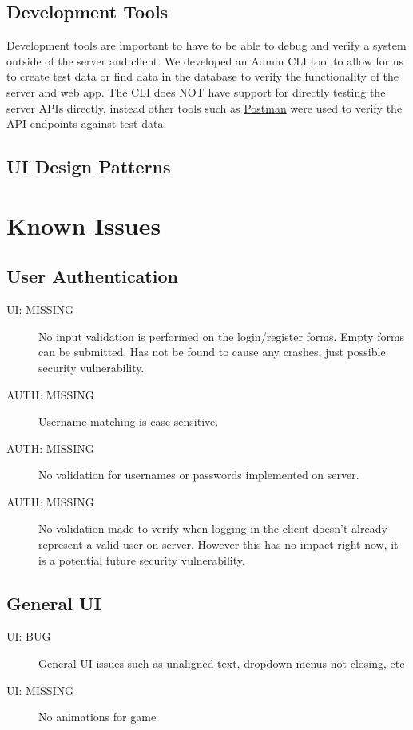 \documentclass{article}
\begin{document}
\subsection{Development Tools}

Development tools are important to have to be able to debug and verify a system outside of the server and client.  We developed an Admin CLI tool to allow for us to create test data or find data in the database to verify the functionality of the server and web app.
The CLI does NOT have support for directly testing the server APIs directly, instead other tools such as \href{https://www.postman.com}{Postman} were used to verify the API endpoints against test data.

\subsection{UI Design Patterns}

\section{Known Issues}

\subsection{User Authentication}

\begin{description}
  \item[UI: MISSING] No input validation is performed on the login/register forms.  Empty forms can be submitted.  Has not be found to cause any crashes, just possible security vulnerability.
  \item[AUTH: MISSING] Username matching is case sensitive.
  \item[AUTH: MISSING] No validation for usernames or passwords implemented on server.
  \item[AUTH: MISSING] No validation made to verify when logging in the client doesn't already represent a valid user on server.  However this has no impact right now, it is a potential future security vulnerability.  
\end{description}

\subsection{General UI}

\begin{description}
  \item[UI: BUG] General UI issues such as unaligned text, dropdown menus not closing, etc
  \item[UI: MISSING] No animations for game
\end{description}
\end{document}

